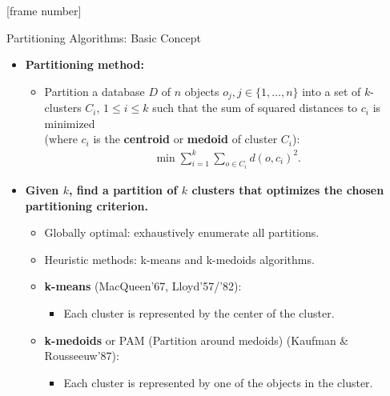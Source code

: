 \documentclass[aspectratio=169,t,xcolor=dvipsnames]{beamer}
\begin{document}
  {
    [frame number]
    \begin{frame}{Partitioning Algorithms: Basic Concept}
        \begin{itemize}
          \item \textbf{Partitioning method:}
          \begin{itemize}
            \item Partition a database $D$ of $n$ objects $o_j, j \in \{1, \ldots, n\}$ into a set of $k$-clusters $C_i$, $1 \leq i \leq k$ such that the sum of squared distances to $c_i$ is minimized \\ (where $c_i$ is the \textbf{\color{airforceblue}centroid} or \textbf{\color{airforceblue}medoid} of cluster $C_i$):
            \begin{align}
              \min \sum_{i=1}^{k} \sum_{o \in C_i} d(o,c_i)^2.
            \end{align}
          \end{itemize}
          \item \textbf{Given $k$, find a partition of $k$ clusters that optimizes the chosen partitioning criterion.}
          \begin{itemize}
            \item Globally optimal: exhaustively enumerate all partitions.
            \item Heuristic methods: k-means and k-medoids algorithms.
            \item \textbf{\color{airforceblue}k-means} (MacQueen'67, Lloyd'57/'82):
            \begin{itemize}
              \item Each cluster is represented by the center of the cluster.
            \end{itemize}
            \item \textbf{\color{airforceblue}k-medoids} or PAM (Partition around medoids) (Kaufman \& Rousseeuw'87):
            \begin{itemize}
              \item Each cluster is represented by one of the objects in the cluster.
            \end{itemize}
          \end{itemize}
        \end{itemize}
    \end{frame}
  }
\end{document}

